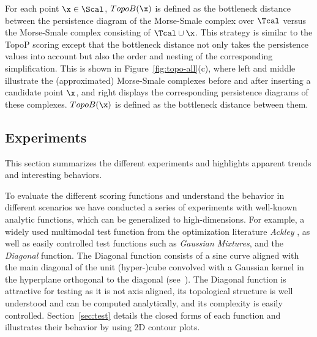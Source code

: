  For each point $\x \in \Scal$, $TopoB(\x)$ is defined as the bottleneck distance between the persistence diagram of the Morse-Smale complex over $\Tcal$ versus the Morse-Smale complex consisting of $\Tcal \cup \x$.
%
This strategy is similar to the TopoP scoring except that the bottleneck distance not only takes the persistence values into account but also the order  and nesting of the corresponding simplification.
%
This is shown in Figure~\ref{fig:topo-all}(c), where left and middle illustrate the (approximated) Morse-Smale complexes before and after inserting a candidate point $\x$, and right displays the corresponding persistence diagrams of these complexes.
%
$TopoB(\x)$ is defined as the bottleneck distance between them.

\subsection{Experiments}
\label{sec:exp}

This section summarizes the different experiments and highlights apparent trends and interesting behaviors.

 To evaluate the different scoring functions and understand the behavior in different scenarios we have conducted a series of experiments with well-known analytic functions, which can be generalized to high-dimensions.
%
For example, a widely used multimodal test function from the optimization literature \emph{Ackley} \cite{Ackley1987}, as well as easily controlled test functions such as \emph{Gaussian Mixtures}, and the \emph{Diagonal} function.
%
The Diagonal function consists of a sine curve aligned with the main diagonal of the unit (hyper-)cube convolved with a Gaussian kernel in the hyperplane orthogonal to the diagonal (see~\cite{GerberBremerPascucci2010}).
%
The Diagonal function is attractive for testing as it is not axis aligned, its topological structure is well understood and can be computed analytically, and its complexity is easily controlled.
%
Section~\ref{sec:test} details the closed forms of each function and illustrates their behavior by using 2D contour plots.

